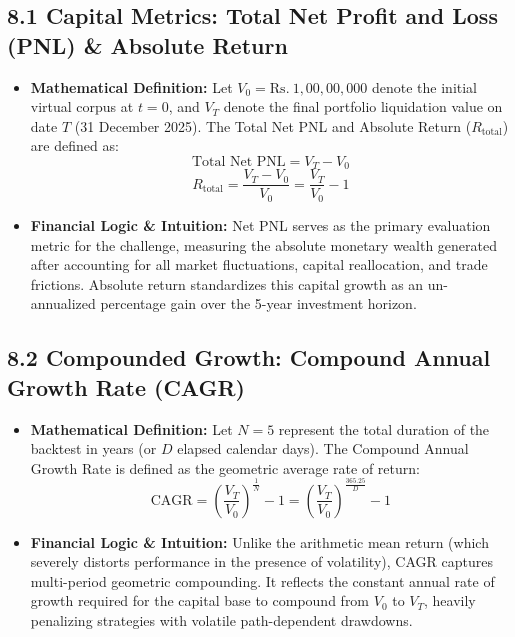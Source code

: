 \documentclass[11pt,a4paper]{article}
\begin{document}
\subsection{8.1 Capital Metrics: Total Net Profit and Loss (PNL) \& Absolute Return}
\begin{itemize}[leftmargin=1.5em]
    \item \textbf{Mathematical Definition:} Let $V_0 = \text{Rs.}~1,00,00,000$ denote the initial virtual corpus at $t = 0$, and $V_T$ denote the final portfolio liquidation value on date $T$ (31 December 2025). The Total Net PNL and Absolute Return ($R_{\text{total}}$) are defined as:
    \begin{equation}
        \text{Total Net PNL} = V_T - V_0
    \end{equation}
    \begin{equation}
        R_{\text{total}} = \frac{V_T - V_0}{V_0} = \frac{V_T}{V_0} - 1
    \end{equation}
    \item \textbf{Financial Logic \& Intuition:} Net PNL serves as the primary evaluation metric for the challenge, measuring the absolute monetary wealth generated after accounting for all market fluctuations, capital reallocation, and trade frictions. Absolute return standardizes this capital growth as an un-annualized percentage gain over the 5-year investment horizon.
\end{itemize}

\subsection{8.2 Compounded Growth: Compound Annual Growth Rate (CAGR)}
\begin{itemize}[leftmargin=1.5em]
    \item \textbf{Mathematical Definition:} Let $N = 5$ represent the total duration of the backtest in years (or $D$ elapsed calendar days). The Compound Annual Growth Rate is defined as the geometric average rate of return:
    \begin{equation}
        \text{CAGR} = \left( \frac{V_T}{V_0} \right)^{\frac{1}{N}} - 1 = \left( \frac{V_T}{V_0} \right)^{\frac{365.25}{D}} - 1
    \end{equation}
    \item \textbf{Financial Logic \& Intuition:} Unlike the arithmetic mean return (which severely distorts performance in the presence of volatility), CAGR captures multi-period geometric compounding. It reflects the constant annual rate of growth required for the capital base to compound from $V_0$ to $V_T$, heavily penalizing strategies with volatile path-dependent drawdowns.
\end{itemize}
\end{document}
